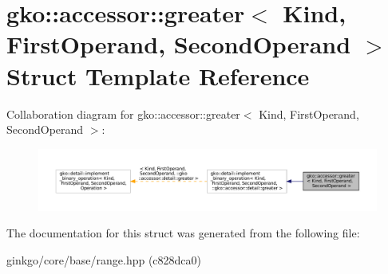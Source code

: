 \hypertarget{structgko_1_1accessor_1_1greater}{}\section{gko\+:\+:accessor\+:\+:greater$<$ Kind, First\+Operand, Second\+Operand $>$ Struct Template Reference}
\label{structgko_1_1accessor_1_1greater}


Collaboration diagram for gko\+:\+:accessor\+:\+:greater$<$ Kind, First\+Operand, Second\+Operand $>$\+:
\nopagebreak
\begin{figure}[H]
\begin{center}
\leavevmode
\includegraphics[width=350pt]{structgko_1_1accessor_1_1greater__coll__graph}
\end{center}
\end{figure}


The documentation for this struct was generated from the following file\+:\begin{DoxyCompactItemize}
\item 
ginkgo/core/base/range.\+hpp (c828dca0)\end{DoxyCompactItemize}
